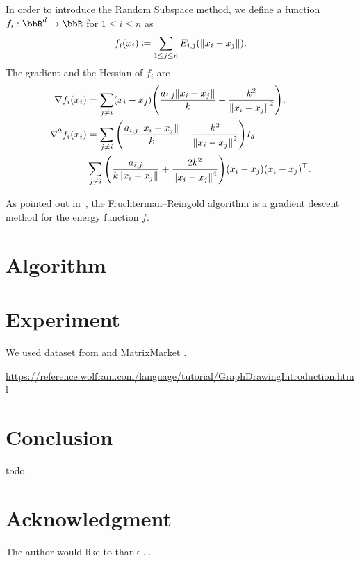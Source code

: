 \documentclass[journal]{IEEEtran}
\newcommand{\defeq}{\coloneqq}
\begin{document}
In order to introduce the Random Subspace method, we define a function $f_i: \bbR^{d} \to \bbR$ for $1 \leq i \leq n$ as
\begin{equation*}
  f_i(x_i) \defeq \sum_{1 \leq j \leq n} E_{i,j}(\norm{x_i - x_j}).
\end{equation*}
The gradient and the Hessian of $f_i$ are
\begin{align*}
  \nabla f_i(x_i)   & = \sum_{j \neq i} (x_i-x_j) \qty(\frac{a_{i,j}\norm{x_i-x_j}}{k} - \frac{k^2}{\norm{x_i - x_j}^2}),                   \\
  \nabla^2 f_i(x_i) & = \sum_{j \neq i} \qty(\frac{a_{i,j}\norm{x_i-x_j}}{k} - \frac{k^2}{\norm{x_i - x_j}^2}) I_d +                        \\
                    & \sum_{j \neq i} \qty(\frac{a_{i,j}}{k \norm{x_i-x_j}} + \frac{2k^2}{\norm{x_i - x_j}^4}) (x_i - x_j)(x_i - x_j)^\top.
\end{align*}

As pointed out in~\cite{tunkelang1999numerical},
the Fruchterman--Reingold algorithm is a gradient descent method for the energy function $f$.


\section{Algorithm} \label{sec:algorithm}

\section{Experiment} \label{sec:experiment}

We used dataset from \cite{davis2011university} and MatrixMarket \cite{boisvertMatrixMarketWeb1997}.

\url{https://reference.wolfram.com/language/tutorial/GraphDrawingIntroduction.html}

\section{Conclusion} \label{sec:conclusion}

todo

\section*{Acknowledgment}

The author would like to thank ...

\end{document}
